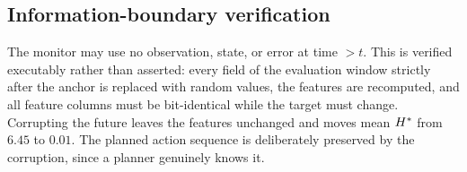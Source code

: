 \subsection{Information-boundary verification}

The monitor may use no observation, state, or error at time $>t$. This is verified
executably rather than asserted: every field of the evaluation window strictly after the anchor
is replaced with random values, the features are recomputed, and all feature columns must be
bit-identical while the target must change. Corrupting the future leaves the features
unchanged and moves mean $H^{*}$ from $6.45$ to $0.01$. The planned action sequence is
deliberately preserved by the corruption, since a planner genuinely knows it.
